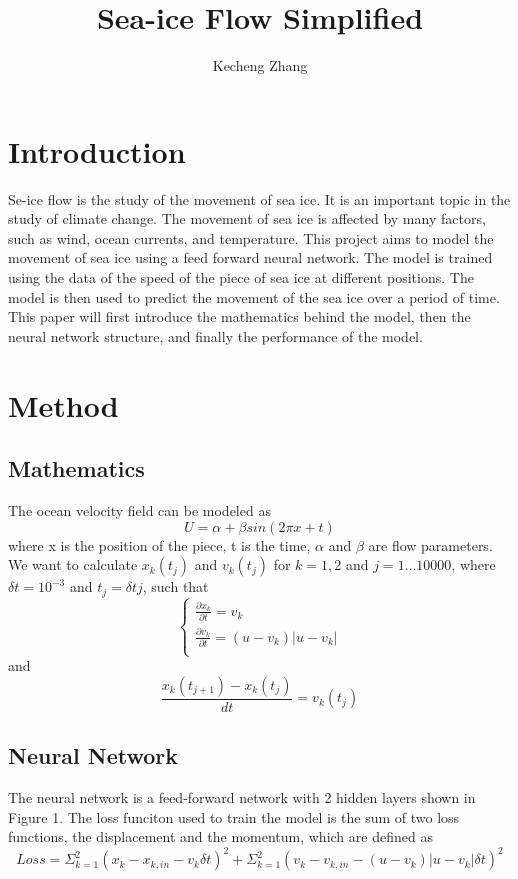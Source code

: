 \documentclass[12pt, a4paper]{article}
\begin{document}
\title{Sea-ice Flow Simplified}
\author{Kecheng Zhang}
\maketitle


\section{Introduction}
Se-ice flow is the study of the movement of sea ice. It is an important topic in the study of climate change. The movement of sea ice is affected by many factors, such as wind, ocean currents, and temperature.
This project aims to model the movement of sea ice using a feed forward neural network. The model is trained using the data of the speed of the piece of sea ice at different positions. The model is then used to predict the movement of the sea ice over a period of time.
This paper will first introduce the mathematics behind the model, then the neural network structure, and finally the performance of the model.
\section{Method}

\subsection{Mathematics}
The ocean velocity field can be modeled as
$$ U = \alpha + \beta sin(2 \pi x + t) $$
where x is the position of the piece, t is the time, $\alpha$ and $\beta$ are flow parameters.
We want to calculate
$x_k(t_j)$ and $v_k(t_j)$ for $k = 1, 2$ and $j = 1\dots10000$, where
$\delta t = 10^{-3}$ and $t_j = \delta t j$, such that
$$\begin{cases}
    \frac{\partial x_k}{\partial t} = v_k\\
    \frac{\partial v_k}{\partial t} = (u - v_k) |u - v_k|\\
    \end{cases}$$
and $$ \frac{x_k(t_{j+1}) - x_k(t_j)}{dt} = v_k(t_j)$$

\subsection{Neural Network}
The neural network is a feed-forward network with 2 hidden layers shown in Figure 1. The loss funciton used to train the model is the sum of two loss functions, the displacement and the momentum, which are defined as
$$Loss = \Sigma^2_{k=1}(x_k - x_{k,in} - v_k\delta t)^2 + \Sigma^2_{k=1}(v_k - v_{k,in} - (u - v_k) |u - v_k|\delta t)^2$$
\end{document}
